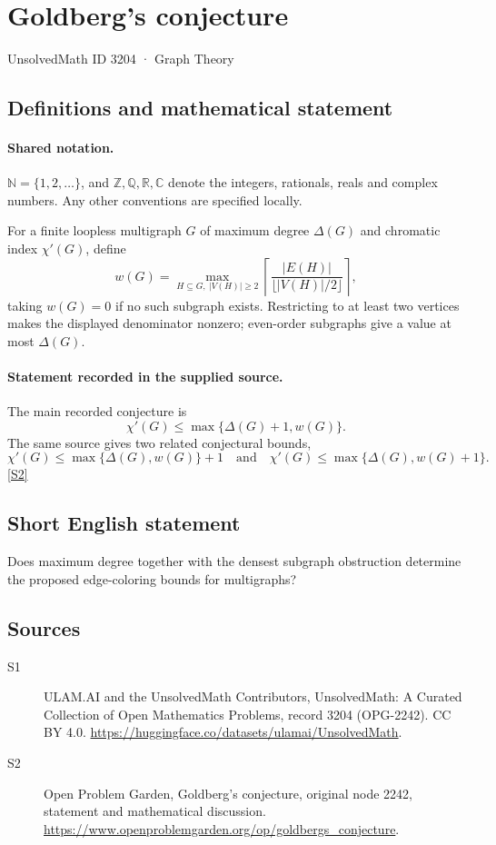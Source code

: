 \documentclass[11pt]{article}
\newcommand{\sref}[2]{\hyperlink{source:#1:#2}{[S#2]}}
\begin{document}
\setcounter{section}{3203}
\section{Goldberg's conjecture}\label{3204}
{\small\sffamily UnsolvedMath ID 3204 · Graph Theory}
\subsection{Definitions and mathematical statement}

\paragraph{Shared notation.}$\mathbb N=\{1,2,\ldots\}$, and $\mathbb Z,\mathbb Q,\mathbb R,\mathbb C$ denote the integers, rationals, reals and complex numbers. Any other conventions are specified locally.


For a finite loopless multigraph $G$ of maximum degree $\Delta(G)$ and chromatic index $\chi'(G)$, define \[w(G)=\max_{H\subseteq G,\ |V(H)|\ge2}\left\lceil\frac{|E(H)|}{\lfloor |V(H)|/2\rfloor}\right\rceil,\] taking $w(G)=0$ if no such subgraph exists. Restricting to at least two vertices makes the displayed denominator nonzero; even-order subgraphs give a value at most $\Delta(G)$.
\paragraph{Statement recorded in the supplied source.}
The main recorded conjecture is \[\chi'(G)\le\max\{\Delta(G)+1,w(G)\}.\] The same source gives two related conjectural bounds, \[\chi'(G)\le\max\{\Delta(G),w(G)\}+1\quad\text{and}\quad\chi'(G)\le\max\{\Delta(G),w(G)+1\}.\] \sref{3204}{2}
\subsection{Short English statement}
Does maximum degree together with the densest subgraph obstruction determine the proposed edge-coloring bounds for multigraphs?
\subsection{Sources}
\begin{description}
\item[\hypertarget{source:3204:1}{S1}] ULAM.AI and the UnsolvedMath Contributors, UnsolvedMath: A Curated Collection of Open Mathematics Problems, record 3204 (OPG-2242). CC BY 4.0. \url{https://huggingface.co/datasets/ulamai/UnsolvedMath}.
\item[\hypertarget{source:3204:2}{S2}] Open Problem Garden, Goldberg's conjecture, original node 2242, statement and mathematical discussion. \url{https://www.openproblemgarden.org/op/goldbergs_conjecture}.
\end{description}
\label{end:3204}
\end{document}
